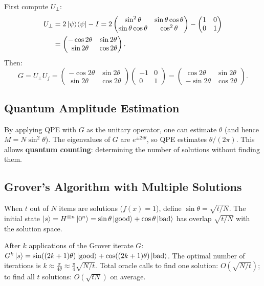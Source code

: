 \documentclass[10pt,a4paper]{article}
\begin{document}
First compute $U_\perp$:
\begin{align*}
U_\perp &= 2\ket{\psi}\!\bra{\psi}-I = 2\begin{pmatrix}\sin^2\theta&\sin\theta\cos\theta\\\sin\theta\cos\theta&\cos^2\theta\end{pmatrix}-\begin{pmatrix}1&0\\0&1\end{pmatrix}\\
&=\begin{pmatrix}-\cos 2\theta&\sin 2\theta\\\sin 2\theta&\cos 2\theta\end{pmatrix}.
\end{align*}
Then:
\[
G=U_\perp U_f = \begin{pmatrix}-\cos 2\theta&\sin 2\theta\\\sin 2\theta&\cos 2\theta\end{pmatrix}\begin{pmatrix}-1&0\\0&1\end{pmatrix}=\begin{pmatrix}\cos 2\theta&\sin 2\theta\\-\sin 2\theta&\cos 2\theta\end{pmatrix}.
\]

\subsection{Quantum Amplitude Estimation}

By applying QPE with $G$ as the unitary operator, one can estimate $\theta$ (and hence $M=N\sin^2\theta$). The eigenvalues of $G$ are $e^{\pm 2i\theta}$, so QPE estimates $\theta/(2\pi)$. This allows \textbf{quantum counting}: determining the number of solutions without finding them.

\subsection{Grover's Algorithm with Multiple Solutions}

When $t$ out of $N$ items are solutions ($f(x)=1$), define $\sin\theta=\sqrt{t/N}$. The initial state $\ket{s}=H^{\otimes n}\ket{0^n}=\sin\theta\ket{\text{good}}+\cos\theta\ket{\text{bad}}$ has overlap $\sqrt{t/N}$ with the solution space.

After $k$ applications of the Grover iterate $G$: $G^k\ket{s}=\sin((2k+1)\theta)\ket{\text{good}}+\cos((2k+1)\theta)\ket{\text{bad}}$. The optimal number of iterations is $k\approx\frac{\pi}{4\theta}\approx\frac{\pi}{4}\sqrt{N/t}$. Total oracle calls to find one solution: $O(\sqrt{N/t})$; to find all $t$ solutions: $O(\sqrt{tN})$ on average.
\end{document}
